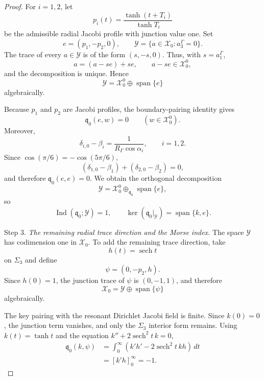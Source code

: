 \documentclass[10pt,a4paper]{amsart}
\begin{document}
\begin{proof}
For $i=1,2$, let
\[
p_i(t)=\frac{\tanh(t+T_i)}{\tanh T_i}
\]
be the admissible radial Jacobi profile with junction value one. Set
\[
e=(p_1,-p_2,0),
\qquad
\mathcal Y=\{a\in\mathcal X_0:a_3^\Gamma=0\}.
\]
The trace of every $a\in\mathcal Y$ is of the form $(s,-s,0)$. Thus, with $s=a_1^\Gamma$,
\[
a=(a-se)+se,
\qquad a-se\in\mathcal X_0^0,
\]
and the decomposition is unique. Hence
\[
\mathcal Y=\mathcal X_0^0\oplus\operatorname{span}\{e\}
\]
algebraically.

Because $p_1$ and $p_2$ are Jacobi profiles, the boundary-pairing identity gives
\[
\mathfrak q_0(e,w)=0
\qquad(w\in\mathcal X_0^0).
\]
Moreover,
\[
\delta_{i,0}-\beta_i=\frac{1}{R_\Gamma\cos\alpha_i},
\qquad i=1,2.
\]
Since $\cos(\pi/6)=-\cos(5\pi/6)$,
\[
(\delta_{1,0}-\beta_1)+(\delta_{2,0}-\beta_2)=0,
\]
and therefore $\mathfrak q_0(e,e)=0$. We obtain the orthogonal decomposition
\[
\mathcal Y
=\mathcal X_0^0\oplus_{\mathfrak q_0}\operatorname{span}\{e\},
\]
so
\[
\operatorname{Ind}(\mathfrak q_0;\mathcal Y)=1,
\qquad
\ker(\mathfrak q_0|_{\mathcal Y})=\operatorname{span}\{k,e\}.
\]

\medskip
\noindent Step 3. \emph{The remaining radial trace direction and the Morse index.}
The space $\mathcal Y$ has codimension one in $\mathcal X_0$. To add the remaining trace direction, take
\[
h(t)=\operatorname{sech}t
\]
on $\Sigma_3$ and define
\[
\psi=(0,-p_2,h).
\]
Since $h(0)=1$, the junction trace of $\psi$ is $(0,-1,1)$, and therefore
\[
\mathcal X_0=\mathcal Y\oplus\operatorname{span}\{\psi\}
\]
algebraically.

The key pairing with the resonant Dirichlet Jacobi field is finite. Since $k(0)=0$, the junction term vanishes, and only the $\Sigma_3$ interior form remains. Using $k(t)=\tanh t$ and the equation $k''+2\operatorname{sech}^2t\,k=0$,
\[
\begin{aligned}
\mathfrak q_0(k,\psi)
&=\int_0^\infty
\left(k'h'-2\operatorname{sech}^2t\,kh\right)\,dt\\
&=[k'h]_{0}^{\infty}=-1.
\end{aligned}
\]


\end{proof}
\end{document}
